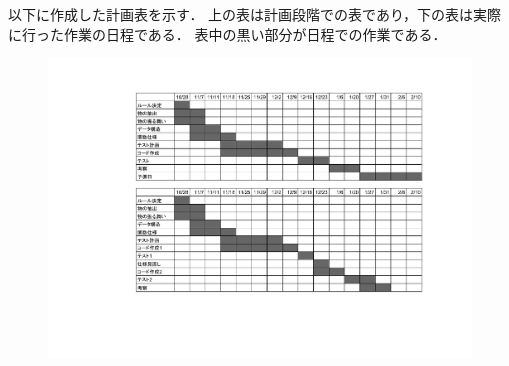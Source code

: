 以下に作成した計画表を示す．
上の表は計画段階での表であり，下の表は実際に行った作業の日程である．
表中の黒い部分が日程での作業である．

\begin{figure}[htb]
  \begin{center}
    \includegraphics[scale=0.5,bb=150 106 765 544]{./img/plan_image.pdf}
  \end{center}
\end{figure}
